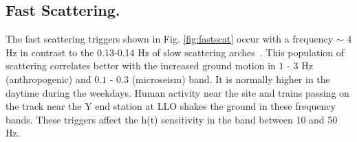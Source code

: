 \documentclass[12pt]{iopart}
\begin{document}




\subsection{Fast Scattering.}
The fast scattering triggers shown in Fig. \ref{fig:fastscat} occur with a frequency $\sim$ 4 Hz in contrast to the 0.13-0.14 Hz of slow scattering arches~\cite{alogjosh}. This population of scattering correlates better with the increased ground motion in  $1$ - $3$ Hz (anthropogenic) and $0.1$ - $0.3$ (microseism) band. It is normally higher in the daytime during the weekdays. Human activity near the site and trains passing on the track near the Y end station at LLO shakes the ground in these frequency bands. 
These triggers affect the h(t) sensitivity in the band between 10 and 50 Hz.
\end{document}
